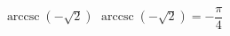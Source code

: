  {$\operatorname{arccsc} \left( -\sqrt{2} \right)$ }
{ $\operatorname{arccsc} \left( -\sqrt{2} \right) = -\dfrac{\pi}{4}$}
